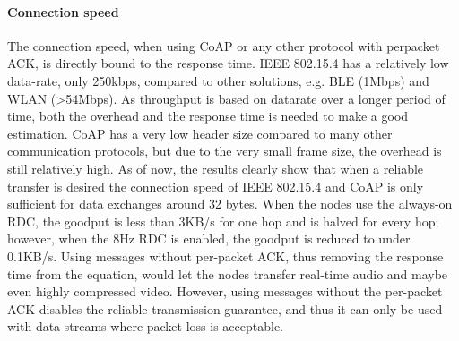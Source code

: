 \paragraph{Connection speed}
The connection speed,
	when using CoAP or any other protocol with perpacket ACK,
	is directly bound to the response time.
IEEE 802.15.4 has a relatively low data-rate,
	only 250kbps,
	compared to other solutions,
	e.g.
BLE (1Mbps) and WLAN (>54Mbps).
As throughput is based on datarate over a longer period of time,
	both the overhead and the response time is needed to make a good estimation.
CoAP has a very low header size compared to many other communication protocols,
	but due to the very small frame size,
	the overhead is still relatively high.
As of now,
	the results clearly show that when a reliable transfer is desired the connection speed of IEEE 802.15.4 and CoAP is only sufficient for data exchanges around 32 bytes.
When the nodes use the always-on RDC,
	the goodput is less than 3KB/s for one hop and is halved for every hop;
	however,
	when the 8Hz RDC is enabled,
	the goodput is reduced to under 0.1KB/s.
Using messages without per-packet ACK,
	thus removing the response time from the equation,
	would let the nodes transfer real-time audio and maybe even highly compressed video.
However,
	using messages without the per-packet ACK disables the reliable transmission guarantee,
	and thus it can only be used with data streams where packet loss is acceptable.



